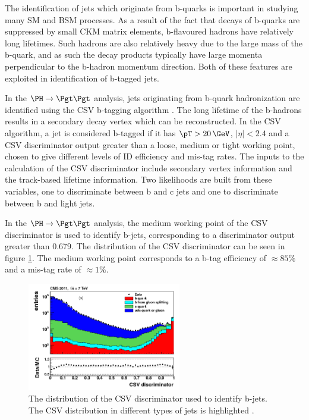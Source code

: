The identification of jets which originate from b-quarks is important in
studying many
\ac{SM} and \ac{BSM} processes. As a result of the fact that decays of b-quarks
are suppressed by small CKM matrix elements, b-flavoured hadrons have relatively
long lifetimes. Such hadrons are also relatively heavy due to the large mass of
the b-quark, and as such the decay products typically have large momenta
perpendicular to the b-hadron momentum direction. Both of these features are
exploited in identification of b-tagged jets.

In the $\PH \to \Pgt\Pgt$ analysis, jets originating from b-quark
hadronization are identified using the \ac{CSV} b-tagging
algorithm \cite{bjets}. The long lifetime of the b-hadrons results in a
secondary decay vertex which can be reconstructed. In the \ac{CSV} algorithm, a
jet is considered b-tagged if it has $\pT>20\,\GeV$, $|\eta|<2.4$ and a
\ac{CSV} discriminator output greater than a loose, medium or tight working
point, chosen to give different levels of ID efficiency and mis-tag rates. The
inputs to the calculation of the \ac{CSV} discriminator include secondary
vertex information and the track-based lifetime information. Two likelihoods are
built from these variables, one to discriminate between b and c jets and one to
discriminate between b and light jets. 

In the $\PH\to\Pgt\Pgt$ analysis, the medium working point of the \ac{CSV}
discriminator is used to identify b-jets, corresponding to a discriminator
output greater than 0.679. The distribution of the \ac{CSV} discriminator 
can be seen in figure \ref{fig:csv}. The medium working point corresponds to a
b-tag efficiency of $\approx 85\%$ and a mis-tag rate of $\approx 1\%$. 

\begin{figure}
\begin{center}
    \includegraphics[width=0.6\textwidth]
      {plots/reco/csv.png}
\end{center}
\caption{
The distribution of the \ac{CSV} discriminator used to identify b-jets. The
\ac{CSV} distribution in different types of jets is highlighted \cite{bjets}.     
}
\label{fig:csv}
\end{figure}


